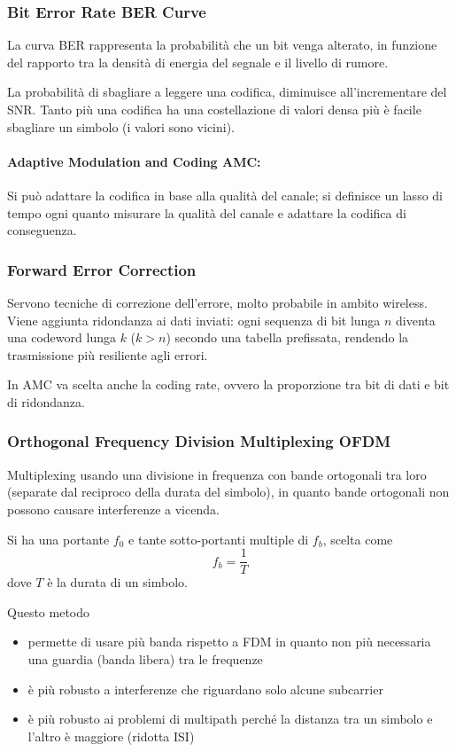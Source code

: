 \subsubsection{Bit Error Rate BER Curve}

La curva BER rappresenta la probabilità che un bit venga alterato, in funzione del rapporto tra la densità di energia del segnale e il livello di rumore.

La probabilità di sbagliare a leggere una codifica, diminuisce all'incrementare del SNR. Tanto più una codifica ha una costellazione di valori densa più è facile sbagliare un simbolo (i valori sono vicini).

\paragraph{Adaptive Modulation and Coding AMC:} Si può adattare la codifica in base alla qualità del canale; si definisce un lasso di tempo ogni quanto misurare la qualità del canale e adattare la codifica di conseguenza.

\subsubsection{Forward Error Correction}

Servono tecniche di correzione dell'errore, molto probabile in ambito wireless. Viene aggiunta ridondanza ai dati inviati: ogni sequenza di bit lunga $n$ diventa una codeword lunga $k$ ($k > n$) secondo una tabella prefissata, rendendo la trasmissione più resiliente agli errori.

In AMC va scelta anche la coding rate, ovvero la proporzione tra bit di dati e bit di ridondanza.

\subsubsection{Orthogonal Frequency Division Multiplexing OFDM}

Multiplexing usando una divisione in frequenza con bande ortogonali tra loro (separate dal reciproco della durata del simbolo), in quanto bande ortogonali non possono causare interferenze a vicenda.

Si ha una portante $f_0$ e tante sotto-portanti multiple di $f_b$, scelta come
$$ f_b = \frac{1}{T}$$
dove $T$ è la durata di un simbolo.

Questo metodo 
\begin{itemize}
    \item permette di usare più banda rispetto a FDM in quanto non più necessaria una guardia (banda libera) tra le frequenze
    
    \item è più robusto a interferenze che riguardano solo alcune subcarrier
    
    \item è più robusto ai problemi di multipath perché la distanza tra un simbolo e l'altro è maggiore (ridotta ISI)
\end{itemize}

